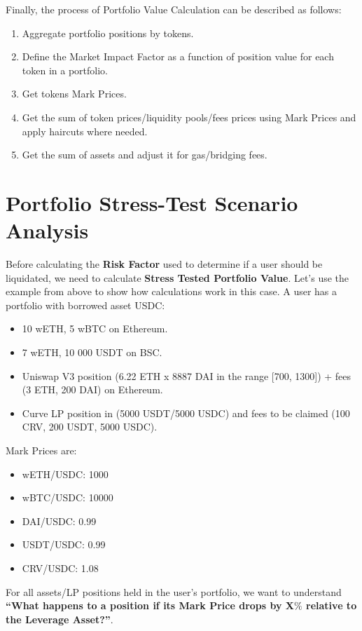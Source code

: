 \documentclass[conference]{IEEEtran}
\begin{document}
Finally, the process of Portfolio Value Calculation can be described as follows:
\begin{enumerate}
	\item Aggregate portfolio positions by tokens.
	\item Define the Market Impact Factor as a function of position value for each token in a portfolio.
	\item Get tokens Mark Prices.
	\item Get the sum of token prices/liquidity pools/fees prices using Mark Prices and apply haircuts where needed.
	\item Get the sum of assets and adjust it for gas/bridging fees.
\end{enumerate}

\section{Portfolio Stress-Test Scenario Analysis}
Before calculating the \textbf{Risk Factor} used to determine if a user should be liquidated, we need to calculate \textbf{Stress Tested Portfolio Value}. Let’s use the example from above to show how calculations work in this case. A user has a portfolio with borrowed asset USDC:

\begin{itemize}
	\item 10 wETH, 5 wBTC on Ethereum.
	\item 7 wETH, 10 000 USDT on BSC.
	\item Uniswap V3 position (6.22 ETH x 8887 DAI in the range [700, 1300]) + fees (3 ETH, 200 DAI) on Ethereum.
	\item Curve LP position in (5000 USDT/5000 USDC) and fees to be claimed (100 CRV, 200 USDT, 5000 USDC).
\end{itemize}

Mark Prices are:

\begin{itemize}
	\item wETH/USDC: 1000
	\item wBTC/USDC: 10000
	\item DAI/USDC: 0.99
	\item USDT/USDC: 0.99
	\item CRV/USDC: 1.08
\end{itemize}

For all assets/LP positions held in the user's portfolio, we want to understand \textbf{“What happens to a position if its Mark Price drops by X$\%$ relative to the Leverage Asset?”}. 
\end{document}
